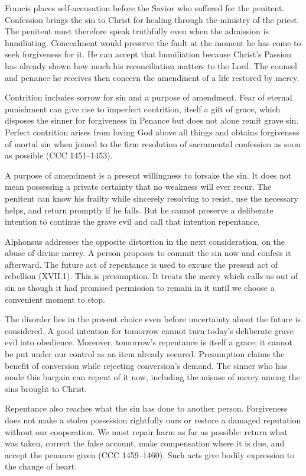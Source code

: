 Francis places self-accusation before the Savior who suffered for the penitent. Confession brings the sin to Christ for healing through the ministry of the priest. The penitent must therefore speak truthfully even when the admission is humiliating. Concealment would preserve the fault at the moment he has come to seek forgiveness for it. He can accept that humiliation because Christ's Passion has already shown how much his reconciliation matters to the Lord. The counsel and penance he receives then concern the amendment of a life restored by mercy.

Contrition includes sorrow for sin and a purpose of amendment. Fear of eternal punishment can give rise to imperfect contrition, itself a gift of grace, which disposes the sinner for forgiveness in Penance but does not alone remit grave sin. Perfect contrition arises from loving God above all things and obtains forgiveness of mortal sin when joined to the firm resolution of sacramental confession as soon as possible (CCC 1451--1453).

A purpose of amendment is a present willingness to forsake the sin. It does not mean possessing a private certainty that no weakness will ever recur. The penitent can know his frailty while sincerely resolving to resist, use the necessary helps, and return promptly if he falls. But he cannot preserve a deliberate intention to continue the grave evil and call that intention repentance.

Alphonsus addresses the opposite distortion in the next consideration, on the abuse of divine mercy. A person proposes to commit the sin now and confess it afterward. The future act of repentance is used to excuse the present act of rebellion (XVII.1). This is presumption. It treats the mercy which calls us out of sin as though it had promised permission to remain in it until we choose a convenient moment to stop.

The disorder lies in the present choice even before uncertainty about the future is considered. A good intention for tomorrow cannot turn today's deliberate grave evil into obedience. Moreover, tomorrow's repentance is itself a grace; it cannot be put under our control as an item already secured. Presumption claims the benefit of conversion while rejecting conversion's demand. The sinner who has made this bargain can repent of it now, including the misuse of mercy among the sins brought to Christ.

Repentance also reaches what the sin has done to another person. Forgiveness does not make a stolen possession rightfully ours or restore a damaged reputation without our cooperation. We must repair harm as far as possible: return what was taken, correct the false account, make compensation where it is due, and accept the penance given (CCC 1459--1460). Such acts give bodily expression to the change of heart.

